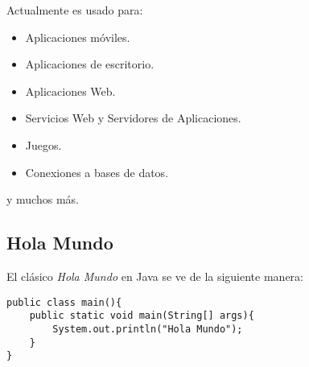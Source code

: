 \documentclass[12pt]{article}
\newcounter{it}
\theoremstyle{largebreak}
\begin{document}
    Actualmente es usado para:
    \begin{itemize}
        \item Aplicaciones móviles.
        \item Aplicaciones de escritorio.
        \item Aplicaciones Web.
        \item Servicios Web y Servidores de Aplicaciones.
        \item Juegos.
        \item Conexiones a bases de datos.
    \end{itemize}
    y muchos más.
    
    \subsection{Hola Mundo}

    El clásico \textit{Hola Mundo} en Java se ve de la siguiente manera:

    \begin{lstlisting}[caption={Hola Mundo en Java},label=DescriptiveLabel]
public class main(){
    public static void main(String[] args){
        System.out.println("Hola Mundo");
    }
}
    \end{lstlisting}
\end{document}
